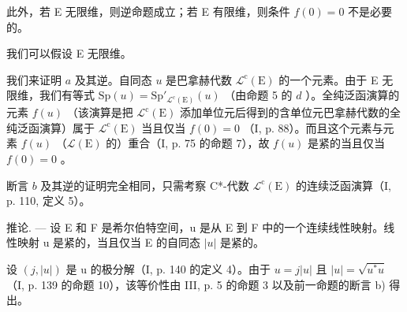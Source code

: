 此外，若 E 无限维，则逆命题成立；若 E 有限维，则条件 \(f(0) = 0\) 不是必要的。

我们可以假设 E 无限维。

我们来证明 \(a\) 及其逆。自同态 \(u\) 是巴拿赫代数 \(\mathcal{L}^{\mathrm{c}}(\mathrm{E})\) 的一个元素。由于 E 无限维，我们有等式 \(\mathrm{Sp}(u) = \mathrm{Sp}'_{\mathcal{L}^{\mathrm{c}}(\mathrm{E})}(u)\) （由命题 5 的 \(d\) ）。全纯泛函演算的元素 \(f(u)\) （该演算是把 \(\mathcal{L}^{\mathrm{c}}(\mathrm{E})\) 添加单位元后得到的含单位元巴拿赫代数的全纯泛函演算）属于 \(\mathcal{L}^{\mathrm{c}}(\mathrm{E})\) 当且仅当 \(f(0) = 0\) （I, p. 88）。而且这个元素与元素 \(f(u)\) （\(\mathcal{L}(\mathrm{E})\) 的）重合（I, p. 75 的命题 7），故 \(f(u)\) 是紧的当且仅当 \(f(0) = 0\) 。

断言 \(b\) 及其逆的证明完全相同，只需考察 C*-代数 \(\mathcal{L}^{\mathrm{c}}(\mathrm{E})\) 的连续泛函演算（I, p. 110, 定义 5）。

推论. --- 设 E 和 F 是希尔伯特空间，u 是从 E 到 F 中的一个连续线性映射。线性映射 u 是紧的，当且仅当 E 的自同态 \(|u|\) 是紧的。

设 \((j, |u|)\) 是 u 的极分解（I, p. 140 的定义 4）。由于 \(u = j|u|\) 且 \(|u| = \sqrt{u^{*}u}\) （I, p. 139 的命题 10），该等价性由 III, p. 5 的命题 3 以及前一命题的断言 b) 得出。

